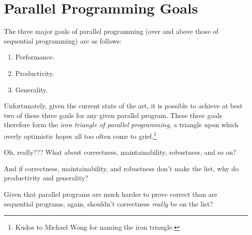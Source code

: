 
\section{Parallel Programming Goals}
\label{sec:intro:Parallel Programming Goals}

The three major goals of parallel programming (over and above those
of sequential programming) are as follows:

\begin{enumerate}
\item	Performance.
\item	Productivity.
\item	Generality.
\end{enumerate}

Unfortunately, given the current state of the art, it is possible to
achieve at best two of these three goals for any given parallel program.
These three goals therefore form the \emph{iron triangle of parallel
programming},
a triangle upon which overly optimistic hopes all too often come to
grief.\footnote{
	Kudos to Michael Wong for naming the iron triangle.}

\QuickQuiz{}
	Oh, really???
	What about correctness, maintainability, robustness, and so on?
 \QuickQuizEnd

\QuickQuiz{}
	And if correctness, maintainability, and robustness don't
	make the list, why do productivity and generality?
 \QuickQuizEnd

\QuickQuiz{}
	Given that parallel programs are much harder to prove
	correct than are sequential programs, again, shouldn't
	correctness \emph{really} be on the list?
 \QuickQuizEnd

